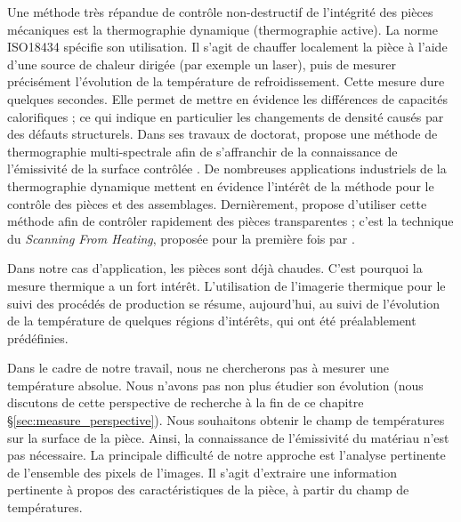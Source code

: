 Une méthode très répandue de contrôle non-destructif de l'intégrité des pièces mécaniques est la thermographie dynamique (thermographie active).
La norme ISO18434 \cite{iso_tc108_iso_2008} spécifie son utilisation.
Il s'agit de chauffer localement la pièce à l'aide d'une source de chaleur dirigée (par exemple un laser), puis de mesurer précisément l'évolution de la température de refroidissement.
Cette mesure dure quelques secondes.
Elle permet de mettre en évidence les différences de capacités calorifiques ; ce qui indique en particulier les changements de densité causés par des défauts structurels.
Dans ses travaux de doctorat, \citeauthor{legrand_thermographie_2002} propose une méthode de thermographie multi-spectrale afin de s'affranchir de la connaissance de l'émissivité de la surface contrôlée \cite{legrand_thermographie_2002}.
De nombreuses applications industriels de la thermographie dynamique mettent en évidence l'intérêt de la méthode pour le contrôle des pièces et des assemblages.
Dernièrement, \citeauthor{herrmann_cracks_2019} propose d'utiliser cette méthode afin de contrôler rapidement des pièces transparentes \cite{herrmann_cracks_2019} ; c'est la technique du \textit{Scanning From Heating}, proposée pour la première fois par \citeauthor{eren_scanning_2009} \cite{eren_scanning_2009} .

Dans notre cas d'application, les pièces sont déjà chaudes.
C'est pourquoi la mesure thermique a un fort intérêt.
L'utilisation de l'imagerie thermique pour le suivi des procédés de production se résume, aujourd'hui, au suivi de l'évolution de la température de quelques régions d'intérêts, qui ont été préalablement prédéfinies.

Dans le cadre de notre travail, nous ne chercherons pas à mesurer une température absolue.
Nous n'avons pas non plus étudier son évolution (nous discutons de cette perspective de recherche à la fin de ce chapitre §\ref{sec:measure_perspective}).
Nous souhaitons obtenir le champ de températures sur la surface de la pièce.
Ainsi, la connaissance de l'émissivité du matériau n'est pas nécessaire.
La principale difficulté de notre approche est l'analyse pertinente de l'ensemble des pixels de l'images.
Il s'agit d'extraire une information pertinente à propos des caractéristiques de la pièce, à partir du champ de températures.

